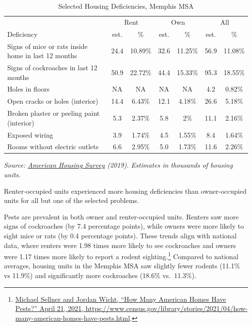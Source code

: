 \documentclass[
  openany]{book}
\begin{document}
\begin{table}

\caption{\label{tab:tbl-AHSselfdef}Selected Housing Deficiencies, Memphis MSA}
\centering
\begin{tabular}[t]{l|c|c|c|c|c|c}
\hline
\multicolumn{1}{c|}{ } & \multicolumn{2}{c|}{Rent} & \multicolumn{2}{c|}{Own} & \multicolumn{2}{c}{All} \\
\cline{2-3} \cline{4-5} \cline{6-7}
Deficiency & est. & \% & est. & \% & est. & \%\\
\hline
Signs of mice or rats inside home in last 12 months & 24.4 & 10.89\% & 32.6 & 11.25\% & 56.9 & 11.08\%\\
\hline
Signs of cockroaches in last 12 months & 50.9 & 22.72\% & 44.4 & 15.33\% & 95.3 & 18.55\%\\
\hline
Holes in floors & NA & NA & NA & NA & 4.2 & 0.82\%\\
\hline
Open cracks or holes (interior) & 14.4 & 6.43\% & 12.1 & 4.18\% & 26.6 & 5.18\%\\
\hline
Broken plaster or peeling paint (interior) & 5.3 & 2.37\% & 5.8 & 2\% & 11.1 & 2.16\%\\
\hline
Exposed wiring & 3.9 & 1.74\% & 4.5 & 1.55\% & 8.4 & 1.64\%\\
\hline
Rooms without electric outlets & 6.6 & 2.95\% & 5.0 & 1.73\% & 11.6 & 2.26\%\\
\hline
\end{tabular}
\end{table}

\emph{Source: \href{https://www.census.gov/newsroom/press-releases/2020/2019-american-housing-survey.html}{American Housing Survey} (2019). Estimates in thousands of housing units.}

Renter-occupied units experienced more housing deficiencies than owner-occupied units for all but one of the selected problems.

Pests are prevalent in both owner and renter-occupied units. Renters saw more signs of cockroaches (by 7.4 percentage points), while owners were more likely to sight mice or rats (by 0.4 percentage points). These trends align with national data, where renters were 1.98 times more likely to see cockroaches and owners were 1.17 times more likely to report a rodent sighting.\footnote{\protect\hyperlink{ref-sellner2021}{Michael Sellner and Jordan Wicht, {``How Many American Homes Have Pests?''} April 21, 2021, \url{https://www.census.gov/library/stories/2021/04/how-many-american-homes-have-pests.html}}.} Compared to national averages, housing units in the Memphis MSA saw slightly fewer rodents (11.1\% vs 11.9\%) and significantly more cockroaches (18.6\% vs.~11.3\%).
\end{document}
